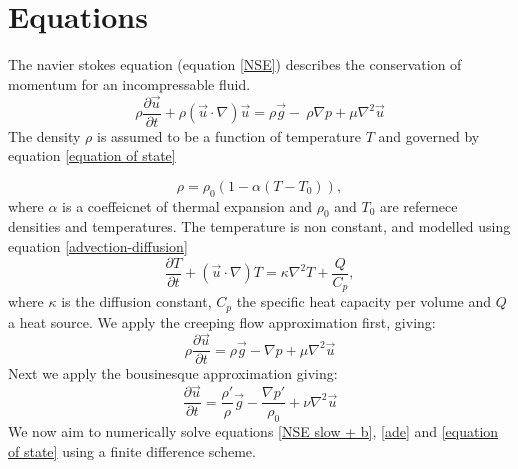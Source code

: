 \documentclass{article}
\begin{document}
\section*{Equations}
The navier stokes equation (equation \ref{NSE}) describes the conservation of momentum for an incompressable fluid.
\begin{equation}
	\rho \frac{\partial \vec{u}}{\partial t} + \rho (\vec{u} \cdot \nabla) \vec{u} = \rho \vec{g} - \ \rho {\nabla p} + \mu \nabla^2 \vec{u}
	\label{NSE}
\end{equation}
The density $\rho$ is assumed to be a function of temperature $T$ and governed by equation \ref{equation of state}

\begin{equation}
	\rho = \rho_0 (1- \alpha (T - T_0)),
	\label{equation of state}
\end{equation}
where $\alpha$ is a coeffeicnet of thermal expansion and $\rho_0$ and $T_0$ are refernece densities and temperatures. The temperature is non constant, and modelled using equation \ref{advection-diffusion}
\begin{equation}
	\frac{\partial T}{\partial t} + (\vec{u} \cdot \nabla) T = \kappa \nabla^2 T + \frac{Q}{C_p},
	\label{ade}
\end{equation}
where $\kappa$ is the diffusion constant, $C_p$ the specific heat capacity per volume and $Q$ a heat source.
\newline
We apply the creeping flow approximation first, giving:
\begin{equation}
	\rho \frac{\partial \vec{u}}{\partial t} = \rho \vec{g} - {\nabla p} + \mu \nabla^2 \vec{u}
	\label{NSE slow}
\end{equation}
Next we apply the bousinesque approximation giving:
\begin{equation}
	\frac{\partial \vec{u}}{\partial t} = \frac{\rho'}{\rho} \vec{g} -   \frac{\nabla p'}{\rho_0} + \nu \nabla^2 \vec{u}
	\label{NSE slow + b}
\end{equation}
We now aim to numerically solve equations \ref{NSE slow + b}, \ref{ade} and \ref{equation of state} using a finite difference scheme.
\end{document}
